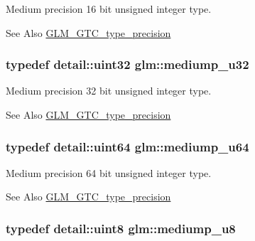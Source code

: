 Medium precision 16 bit unsigned integer type. \begin{DoxySeeAlso}{See Also}
\hyperlink{group__gtc__type__precision}{G\-L\-M\-\_\-\-G\-T\-C\-\_\-type\-\_\-precision} 
\end{DoxySeeAlso}
\hypertarget{group__gtc__type__precision_gad0c27a525045c299a92306eb4cd7c13a}{
\subsubsection[{mediump\-\_\-u32}]{\setlength{\rightskip}{0pt plus 5cm}typedef detail\-::uint32 {\bf glm\-::mediump\-\_\-u32}}}\label{group__gtc__type__precision_gad0c27a525045c299a92306eb4cd7c13a}
Medium precision 32 bit unsigned integer type. \begin{DoxySeeAlso}{See Also}
\hyperlink{group__gtc__type__precision}{G\-L\-M\-\_\-\-G\-T\-C\-\_\-type\-\_\-precision} 
\end{DoxySeeAlso}
\hypertarget{group__gtc__type__precision_ga00c51a16fa190b0a90205d50d6d8a44a}{
\subsubsection[{mediump\-\_\-u64}]{\setlength{\rightskip}{0pt plus 5cm}typedef detail\-::uint64 {\bf glm\-::mediump\-\_\-u64}}}\label{group__gtc__type__precision_ga00c51a16fa190b0a90205d50d6d8a44a}
Medium precision 64 bit unsigned integer type. \begin{DoxySeeAlso}{See Also}
\hyperlink{group__gtc__type__precision}{G\-L\-M\-\_\-\-G\-T\-C\-\_\-type\-\_\-precision} 
\end{DoxySeeAlso}
\hypertarget{group__gtc__type__precision_gac04b372784392e82bd557f300c4de097}{
\subsubsection[{mediump\-\_\-u8}]{\setlength{\rightskip}{0pt plus 5cm}typedef detail\-::uint8 {\bf glm\-::mediump\-\_\-u8}}}\label{group__gtc__type__precision_gac04b372784392e82bd557f300c4de097}
